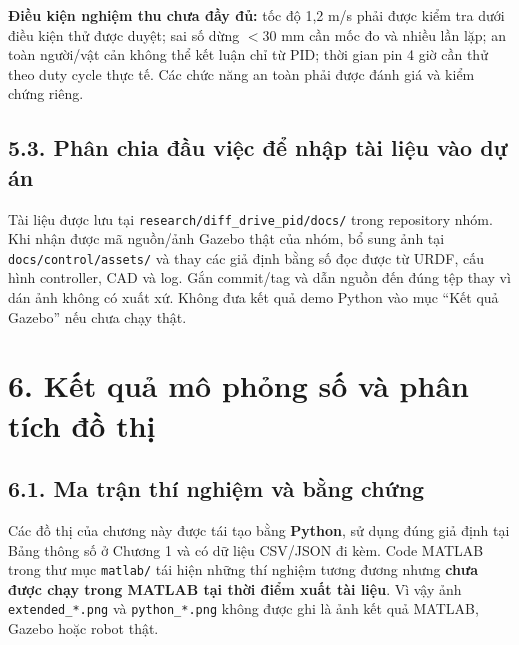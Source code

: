 \documentclass[
  12pt,
  a4paper,
]{article}
\begin{document}
\textbf{Điều kiện nghiệm thu chưa đầy đủ:} tốc độ 1,2 m/s phải được kiểm
tra dưới điều kiện thử được duyệt; sai số dừng \(<30\) mm cần mốc đo và
nhiều lần lặp; an toàn người/vật cản không thể kết luận chỉ từ PID; thời
gian pin 4 giờ cần thử theo duty cycle thực tế. Các chức năng an toàn
phải được đánh giá và kiểm chứng riêng.

\subsection{5.3. Phân chia đầu việc để nhập tài liệu vào dự
án}\label{phuxe2n-chia-ux111ux1ea7u-viux1ec7c-ux111ux1ec3-nhux1eadp-tuxe0i-liux1ec7u-vuxe0o-dux1ef1-uxe1n}

Tài liệu được lưu tại \texttt{research/diff\_drive\_pid/docs/} trong
repository nhóm. Khi nhận được mã nguồn/ảnh Gazebo thật của nhóm, bổ
sung ảnh tại \texttt{docs/control/assets/} và thay các giả định bằng số
đọc được từ URDF, cấu hình controller, CAD và log. Gắn commit/tag và dẫn
nguồn đến đúng tệp thay vì dán ảnh không có xuất xứ. Không đưa kết quả
demo Python vào mục ``Kết quả Gazebo'' nếu chưa chạy thật.

\section{6. Kết quả mô phỏng số và phân tích đồ
thị}\label{kux1ebft-quux1ea3-muxf4-phux1ecfng-sux1ed1-vuxe0-phuxe2n-tuxedch-ux111ux1ed3-thux1ecb}

\subsection{6.1. Ma trận thí nghiệm và bằng
chứng}\label{ma-trux1eadn-thuxed-nghiux1ec7m-vuxe0-bux1eb1ng-chux1ee9ng}

Các đồ thị của chương này được tái tạo bằng \textbf{Python}, sử dụng
đúng giả định tại Bảng thông số ở Chương 1 và có dữ liệu CSV/JSON đi
kèm. Code MATLAB trong thư mục \texttt{matlab/} tái hiện những thí
nghiệm tương đương nhưng \textbf{chưa được chạy trong MATLAB tại thời
điểm xuất tài liệu}. Vì vậy ảnh \texttt{extended\_*.png} và
\texttt{python\_*.png} không được ghi là ảnh kết quả MATLAB, Gazebo hoặc
robot thật.
\end{document}
